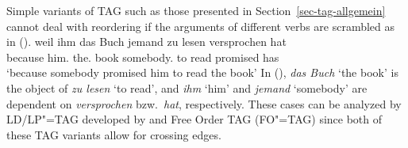 Simple variants of TAG such as those presented in Section~\ref{sec-tag-allgemein} cannot deal with reordering if the arguments of different verbs
are scrambled as in ().
\ea
\label{ex-weil-ihm-das-Buch-jemand-zu-lesen-versprochen-hat-drei}
\gll weil    ihm das Buch jemand   zu lesen versprochen hat\footnotemark\\
     because him.\dat{} the.\acc{} book somebody.\nom{} to read promised has\\
\glt `because somebody promised him to read the book'
\z
In (), \emph{das Buch} `the book' is the object of \emph{zu lesen} `to read', and \emph{ihm}
`him' and \emph{jemand} `somebody' are dependent on \emph{versprochen} bzw.\ \emph{hat}, respectively.
These cases can be analyzed by LD/LP"=TAG developed by \citet{Joshi87b} and Free Order TAG
(FO"=TAG) \citep*[]{BJR91a} since both of these TAG variants allow for
crossing edges.

